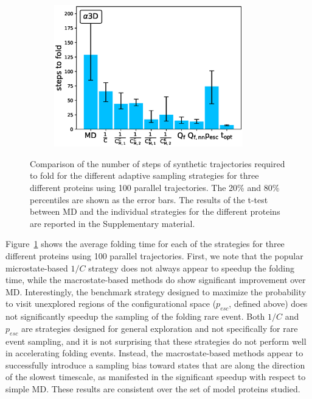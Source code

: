 \begin{figure}[t!]
\begin{subfigure}[t]{0.5\textwidth}
    \includegraphics[width=0.9\textwidth]{figures/A3D_7_steps10000_nparallel100_fold.eps}
  \end{subfigure}
  \caption{Comparison of the number of steps of synthetic trajectories required
  to fold for the different adaptive sampling strategies for three different
  proteins using 100 parallel trajectories. The 20\% and 80\% percentiles are
  shown as the error bars. The results of the t-test between MD and the
  individual strategies for the different proteins are reported in the Supplementary material.}
  \label{fig:Time_fold}
\end{figure}

Figure~\ref{fig:Time_fold} shows the average folding time for each of the
strategies for three different proteins using 100 parallel trajectories. First, we note that the
popular microstate-based $1/C$ strategy does not always appear to speedup the
folding time, while the macrostate-based methods do show significant
improvement over MD. 
Interestingly, the benchmark strategy designed to maximize the probability to
visit unexplored regions of the configurational space  ($p_{esc}$, defined
above) does not significantly speedup the sampling of the folding rare event.
Both $1/C$ and $p_{esc}$ are strategies designed for general exploration and
not specifically for rare event sampling, and it is not surprising that these
strategies do not perform well in accelerating folding events.
Instead, the macrostate-based methods appear to successfully introduce a
sampling bias toward states that are along the direction of the slowest
timescale, as manifested in the significant speedup with respect to simple MD.
These results are consistent over the set of model proteins studied.

